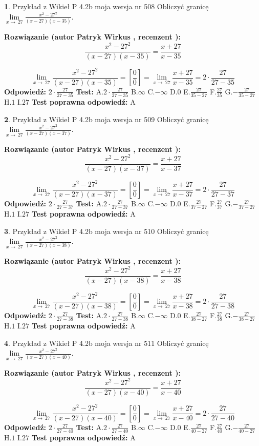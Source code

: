 \documentclass[12pt, a4paper]{article}
\theoremstyle{definition} %
\newtheorem{zad}{}
\newcommand{\zadStart}[1]{\begin{zad}#1\newline}
\newcommand{\zadStop}{\end{zad}}
\newcommand{\rozwStart}[2]{\noindent \textbf{Rozwiązanie (autor #1 , recenzent #2): }\newline}
\newcommand{\rozwStop}{\newline}
\newcommand{\odpStart}{\noindent \textbf{Odpowiedź:}\newline}
\newcommand{\odpStop}{\newline}
\newcommand{\testStart}{\noindent \textbf{Test:}\newline}
\newcommand{\testStop}{\newline}
\newcommand{\kluczStart}{\noindent \textbf{Test poprawna odpowiedź:}\newline}
\newcommand{\kluczStop}{\newline}
\begin{document}
\zadStart{Przykład z Wikieł P 4.2b moja wersja nr 508}
Obliczyć granicę $\lim\limits_{x\to\ 27}\frac{x^{2}-27^{2}}{(x-27)(x-35)}$.
\zadStop
\rozwStart{Patryk Wirkus}{}
$$\frac{x^{2}-27^{2}}{(x-27)(x-35)}=\frac{x+27}{x-35}$$

$$\lim\limits_{x\to\ 27}\frac{x^{2}-27^{2}}{(x-27)(x-35)}=[\frac{0}{0}]=\lim\limits_{x\to\ 27}\frac{x+27}{x-35}=2 \cdot \frac{27}{27-35}$$
\rozwStop
\odpStart
$2 \cdot \frac{27}{27-35}$
\odpStop
\testStart
A.$2 \cdot \frac{27}{27-35}$
B.$\infty$
C.$-\infty$
D.$0$
E.$\frac{27}{35-27}$
F.$\frac{27}{35}$
G.$-\frac{27}{35-27}$
H.$1$
I.$27$
\testStop
\kluczStart
A
\kluczStop



\zadStart{Przykład z Wikieł P 4.2b moja wersja nr 509}
Obliczyć granicę $\lim\limits_{x\to\ 27}\frac{x^{2}-27^{2}}{(x-27)(x-37)}$.
\zadStop
\rozwStart{Patryk Wirkus}{}
$$\frac{x^{2}-27^{2}}{(x-27)(x-37)}=\frac{x+27}{x-37}$$

$$\lim\limits_{x\to\ 27}\frac{x^{2}-27^{2}}{(x-27)(x-37)}=[\frac{0}{0}]=\lim\limits_{x\to\ 27}\frac{x+27}{x-37}=2 \cdot \frac{27}{27-37}$$
\rozwStop
\odpStart
$2 \cdot \frac{27}{27-37}$
\odpStop
\testStart
A.$2 \cdot \frac{27}{27-37}$
B.$\infty$
C.$-\infty$
D.$0$
E.$\frac{27}{37-27}$
F.$\frac{27}{37}$
G.$-\frac{27}{37-27}$
H.$1$
I.$27$
\testStop
\kluczStart
A
\kluczStop



\zadStart{Przykład z Wikieł P 4.2b moja wersja nr 510}
Obliczyć granicę $\lim\limits_{x\to\ 27}\frac{x^{2}-27^{2}}{(x-27)(x-38)}$.
\zadStop
\rozwStart{Patryk Wirkus}{}
$$\frac{x^{2}-27^{2}}{(x-27)(x-38)}=\frac{x+27}{x-38}$$

$$\lim\limits_{x\to\ 27}\frac{x^{2}-27^{2}}{(x-27)(x-38)}=[\frac{0}{0}]=\lim\limits_{x\to\ 27}\frac{x+27}{x-38}=2 \cdot \frac{27}{27-38}$$
\rozwStop
\odpStart
$2 \cdot \frac{27}{27-38}$
\odpStop
\testStart
A.$2 \cdot \frac{27}{27-38}$
B.$\infty$
C.$-\infty$
D.$0$
E.$\frac{27}{38-27}$
F.$\frac{27}{38}$
G.$-\frac{27}{38-27}$
H.$1$
I.$27$
\testStop
\kluczStart
A
\kluczStop



\zadStart{Przykład z Wikieł P 4.2b moja wersja nr 511}
Obliczyć granicę $\lim\limits_{x\to\ 27}\frac{x^{2}-27^{2}}{(x-27)(x-40)}$.
\zadStop
\rozwStart{Patryk Wirkus}{}
$$\frac{x^{2}-27^{2}}{(x-27)(x-40)}=\frac{x+27}{x-40}$$

$$\lim\limits_{x\to\ 27}\frac{x^{2}-27^{2}}{(x-27)(x-40)}=[\frac{0}{0}]=\lim\limits_{x\to\ 27}\frac{x+27}{x-40}=2 \cdot \frac{27}{27-40}$$
\rozwStop
\odpStart
$2 \cdot \frac{27}{27-40}$
\odpStop
\testStart
A.$2 \cdot \frac{27}{27-40}$
B.$\infty$
C.$-\infty$
D.$0$
E.$\frac{27}{40-27}$
F.$\frac{27}{40}$
G.$-\frac{27}{40-27}$
H.$1$
I.$27$
\testStop
\kluczStart
A
\kluczStop
\end{document}
